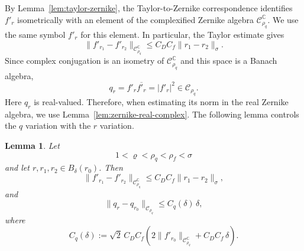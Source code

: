 \documentclass[11pt,a4paper]{amsart}
\newtheorem{lemma}[theorem]{Lemma}
\begin{document}
By Lemma~\ref{lem:taylor-zernike}, the Taylor-to-Zernike
correspondence identifies $f'_r$ isometrically with an element of the
complexified Zernike algebra $\mathcal C_{\rho_q}^{\mathbb C}$.
We use the same symbol $f'_r$ for this element. In particular, the
Taylor estimate gives
\[
\|f'_{r_1}-f'_{r_2}\|_{\mathcal C_{\rho_q}^{\mathbb C}}
\le
C_D C_f\|r_1-r_2\|_\sigma .
\]
Since complex conjugation is an isometry of
$\mathcal C_{\rho_q}^{\mathbb C}$ and this space is a Banach algebra,
\[
q_r
=
f'_r\overline{f'_r}
=
|f'_r|^2
\in \mathcal C_{\rho_q}.
\]
Here $q_r$ is real-valued. Therefore, when estimating its norm in the
real Zernike algebra, we use
Lemma~\ref{lem:zernike-real-complex}.
The following lemma controls the $q$ variation with the $r$ variation.
\begin{lemma}\label{lem:q-variation}
	Let
	\[
	1<\varrho<\rho_q<\rho_f<\sigma
	\]
	and let $r,r_1,r_2\in B_\delta(r_0)$. Then
	\begin{equation}\label{eq:fprime-variation}
		\|f'_{r_1}-f'_{r_2}\|_{\mathcal C_{\rho_q}^{\mathbb C}}
		\le
		C_D C_f\|r_1-r_2\|_\sigma ,
	\end{equation}
	and
	\begin{equation}\label{eq:q-variation}
		\|q_r-q_{r_0}\|_{\mathcal C_{\rho_q}}
		\le
		C_q(\delta)\,\delta ,
	\end{equation}
	where
	\begin{equation}\label{eq:Cq}
		C_q(\delta)
		:=
		\sqrt2\,C_D C_f
		\left(
		2\|f'_{r_0}\|_{\mathcal C_{\rho_q}^{\mathbb C}}
		+
		C_D C_f\,\delta
		\right).
	\end{equation}
\end{lemma}
\end{document}
